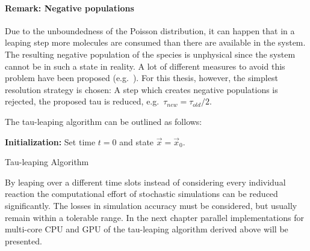 \paragraph{Remark: Negative populations}
Due to the unboundedness of the Poisson distribution, it can happen that in a leaping step more molecules are consumed than there are available in the system. The resulting negative population of the species is unphysical since the system cannot be in such a state in reality. A lot of different measures to avoid this problem have been proposed (e.g.\ \cite{cao_avoiding_2005, anderson_incorporating_2008}). For this thesis, however, the simplest resolution strategy is chosen: A step which creates negative populations is rejected, the proposed tau is reduced, e.g.\ $\tau_{new} = \tau_{old} / 2$. 
\newpage

The tau-leaping algorithm can be outlined as follows: 

\begin{framed}
\begin{algorithm}[H]
\DontPrintSemicolon
{}
 \textbf{Initialization:} Set time $t = 0$ and state $\vec{x} = \vec{x}_0$.\;
 \caption{Tau-leaping Algorithm}
\end{algorithm}
\end{framed}

By leaping over a different time slots instead of considering every individual reaction the computational effort of stochastic simulations can be reduced significantly. The losses in simulation accuracy must be considered, but usually remain within a tolerable range. In the next chapter parallel implementations for multi-core CPU and GPU of the tau-leaping algorithm derived above will be presented. 

\mbox{\color{red}{solve gray-scott and compare to SSA}}

